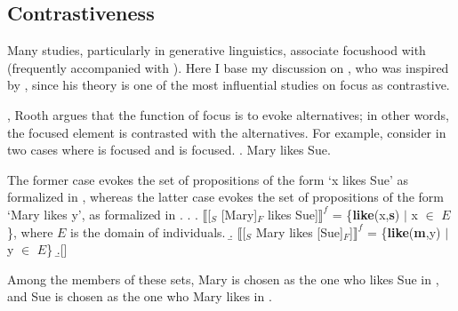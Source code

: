 

\subsection{Contrastiveness}\label{Back:Foc:Contr}

Many studies, particularly in generative linguistics,
associate focushood with  (frequently accompanied with ).
Here I base my discussion on ,
who was inspired by ,
since his theory is one of the most influential studies on focus as contrastive.

,
Rooth argues that the function of focus is to evoke alternatives;
in other words,
the focused element is contrasted with the alternatives.
For example, consider \Next in two cases
where  is focused and  is focused.
%
\ex. Mary likes Sue.

The former case evokes the set of propositions of the form `x likes Sue'
as formalized in \Next[a],
whereas the latter case evokes the set of propositions of the form `Mary likes y', as formalized in \Next[b].
%
\ex.
  \a. $\llbracket$[$_{S}$ [Mary]$_{F}$ likes Sue]$\rrbracket^{f}$ = \{\textbf{like}(x,\textbf{s}) $\mid$ x $\in$ $E$\}, where $E$ is the domain of individuals.
  \b. $\llbracket$[$_{S}$ Mary likes [Sue]$_{F}$]$\rrbracket^{f}$ = \{\textbf{like}(\textbf{m},y) $\mid$ y $\in$ $E$\}
  \b.[] \hfill{\cite[76]{rooth92}}

Among the members of these sets,
Mary is chosen as the one who likes Sue in \Last[a],
and Sue is chosen as the one who Mary likes in \Last[b].

